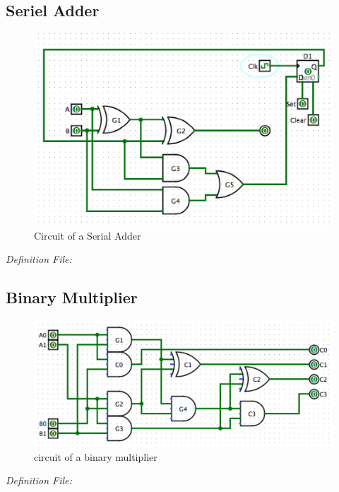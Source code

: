 \documentclass[12pt]{article}
\begin{document}
\subsection{Seriel Adder}
\begin{figure}[H]
    \centering
    \includegraphics[scale=0.6]{sequential_carry_adder.png}
    \caption{Circuit of a Serial Adder}
\end{figure}

\emph{Definition File:}



\subsection{Binary Multiplier}
\begin{figure}[H]
    \centering
    \includegraphics[scale=0.6]{bin_multiplier.png}
    \caption{circuit of a binary multiplier}
\end{figure}
\emph{Definition File:}

\end{document}
